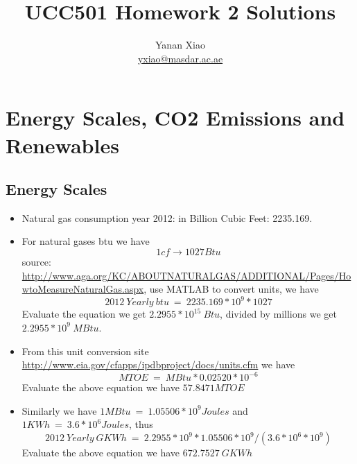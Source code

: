 \documentclass[12pt]{article}
\begin{document}

\title{UCC501 Homework 2 Solutions}
\author{Yanan Xiao\\\url{yxiao@masdar.ac.ae}}
\maketitle{}

\section{Energy Scales, CO2  Emissions and Renewables}
\label{sec:question-1}

\subsection{Energy Scales}
\label{sec:energy-scales}

\begin{itemize}
\item Natural gas consumption year 2012: in Billion Cubic Feet:
  2235.169. 
\item For natural gases btu we have
  \begin{equation}
    \label{eq:1}
    1cf\rightarrow 1027 Btu
  \end{equation}
  source:
  \url{http://www.aga.org/KC/ABOUTNATURALGAS/ADDITIONAL/Pages/HowtoMeasureNaturalGas.aspx},
  use MATLAB to convert units, we have
  \begin{equation}
    \label{eq:2}
    2012~Yearly~btu~=~2235.169*10^{9}*1027
  \end{equation}
  Evaluate the equation we get $2.2955*10^{15}~Btu$, divided by
  millions we get $2.2955*10^{9}~MBtu$.
\item From this unit conversion site
  \url{http://www.eia.gov/cfapps/ipdbproject/docs/units.cfm} we have
  \begin{equation}
    \label{eq:3}
    MTOE~=~MBtu * 0.02520 * 10^{-6}
  \end{equation}
  Evaluate the above equation we have $57.8471 MTOE$
\item Similarly we have $1 MBtu~=~1.05506*10^{9} Joules$ and $1
  KWh~=~3.6*10^{6} Joules$, thus
  \begin{equation}
    \label{eq:4}
    2012~Yearly~GKWh~=~2.2955*10^{9} * 1.05506 *10^{9} / (3.6*10^{6} *
    10^{9}) 
  \end{equation}
  Evaluate the above equation we have $672.7527~GKWh$

\end{itemize}
\end{document}
